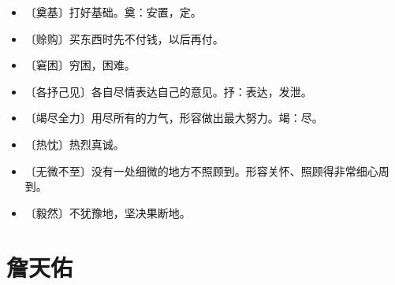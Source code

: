 \documentclass[12pt,UTF-8,openany]{ctexbook}
\begin{document}
\begin{itemize}
    \setlength\itemsep{-0.2em}
    \item 〔奠基〕打好基础。奠：安置，定。
    \item 〔赊购〕买东西时先不付钱，以后再付。
    \item 〔窘困〕穷困，困难。
    \item 〔各抒己见〕各自尽情表达自己的意见。抒：表达，发泄。
    \item 〔竭尽全力〕用尽所有的力气，形容做出最大努力。竭：尽。
    \item 〔热忱〕热烈真诚。
    \item 〔无微不至〕没有一处细微的地方不照顾到。形容关怀、照顾得非常细心周到。
    \item 〔毅然〕不犹豫地，坚决果断地。
\end{itemize}

\chapter{詹天佑}
\end{document}
